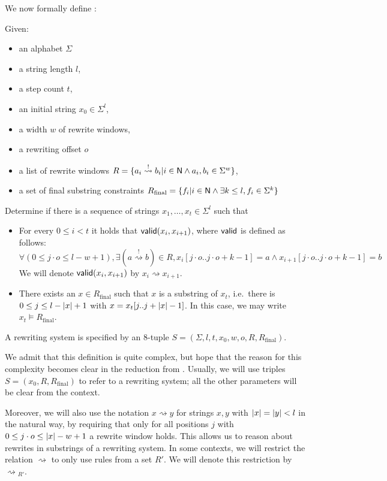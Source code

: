\documentclass[a4paper,UKenglish,cleveref, autoref]{lipics-v2019}
\newcommand{\strent}{\rightsquigarrow}
\newcommand{\constrent}{\overset{!}{\rightsquigarrow}}
\newcommand{\Rfinal}{R_{\text{final}}}
\begin{document}
We now formally define \strconrew{}:
\begin{definition}\label{def:strconrew}
  Given: 
  \begin{itemize}
    \item an alphabet $\Sigma$
    \item a string length $l$,
    \item a step count $t$,
    \item an initial string $x_0 \in \Sigma^l$,
    \item a width $w$ of rewrite windows, 
    \item a rewriting offset $o$
    \item a list of rewrite windows $R = \{a_i \constrent b_i | i \in \nat \land a_i, b_i \in \Sigma^w\}$,
    \item a set of final substring constraints $\Rfinal = \{f_i | i \in \nat \land \exists k \le l, f_i \in \Sigma^k\}$
  \end{itemize}

  Determine if there is a sequence of strings $x_1, \ldots, x_t \in \Sigma^l$ such that 
  \begin{itemize}
    \item For every $0 \le i < t$ it holds that $\textsf{valid}(x_i, x_{i+1})$, where $\textsf{valid}$ is defined as follows:
      \[\forall (0 \le j\cdot o \le l -w + 1), \exists (a \constrent b) \in R, x_i[j\cdot o..j\cdot o+ k-1] = a \land x_{i+1}[j\cdot o..j\cdot o+k-1] = b \]
      We will denote $\textsf{valid}(x_i, x_{i+1})$ by $x_i \strent{} x_{i+1}$. 
    \item There exists an $x \in \Rfinal$ such that $x$ is a substring of $x_t$, i.e.\ there is $0 \le j \le l - |x| + 1$ with $x = x_t[j..j+|x| - 1]$.
      In this case, we may write $x_t \models \Rfinal$.
  \end{itemize}

  A rewriting system is specified by an 8-tuple $S = (\Sigma, l, t, x_0, w, o, R, \Rfinal)$.
\end{definition}

We admit that this definition is quite complex, but hope that the reason for this complexity becomes clear in the reduction from \gennp{}.
Usually, we will use triples $S = (x_0, R, \Rfinal)$ to refer to a rewriting system; all the other parameters will be clear from the context.

Moreover, we will also use the notation $x \strent{} y$ for strings $x, y$ with $|x| = |y| < l$ in the natural way, by requiring that only for all positions $j$ with $0 \le j \cdot o \le |x| - w + 1$ a rewrite window holds. This allows us to reason about rewrites in substrings of a rewriting system. 
In some contexts, we will restrict the relation $\strent{}$ to only use rules from a set $R'$. We will denote this restriction by $\strent{}_{R'}$.
\end{document}
